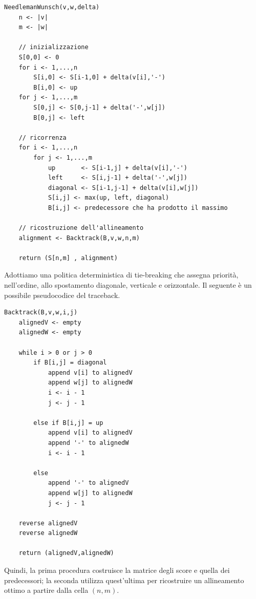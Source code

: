 \begin{codeblock}
\begin{lstlisting}[style=pseudo,caption={Global Alignment}]
NeedlemanWunsch(v,w,delta)
    n <- |v| 
    m <- |w|

    // inizializzazione
    S[0,0] <- 0
    for i <- 1,...,n
        S[i,0] <- S[i-1,0] + delta(v[i],'-')
        B[i,0] <- up
    for j <- 1,...,m
        S[0,j] <- S[0,j-1] + delta('-',w[j])
        B[0,j] <- left

    // ricorrenza
    for i <- 1,...,n
        for j <- 1,...,m
            up       <- S[i-1,j] + delta(v[i],'-')
            left     <- S[i,j-1] + delta('-',w[j])
            diagonal <- S[i-1,j-1] + delta(v[i],w[j])
            S[i,j] <- max(up, left, diagonal)
            B[i,j] <- predecessore che ha prodotto il massimo

    // ricostruzione dell'allineamento
    alignment <- Backtrack(B,v,w,n,m)

    return (S[n,m] , alignment)
\end{lstlisting}
\end{codeblock}

Adottiamo una politica deterministica di tie-breaking che assegna priorità, nell'ordine, allo spostamento diagonale, verticale e orizzontale.
Il seguente è un possibile pseudocodice del traceback.

\begin{codeblock}
\begin{lstlisting}[style=pseudo,caption={Ricostruzione dell'allineamento tramite traceback}]
Backtrack(B,v,w,i,j)
    alignedV <- empty
    alignedW <- empty

    while i > 0 or j > 0
        if B[i,j] = diagonal
            append v[i] to alignedV
            append w[j] to alignedW
            i <- i - 1
            j <- j - 1

        else if B[i,j] = up
            append v[i] to alignedV
            append '-' to alignedW
            i <- i - 1

        else
            append '-' to alignedV
            append w[j] to alignedW
            j <- j - 1

    reverse alignedV
    reverse alignedW

    return (alignedV,alignedW)
\end{lstlisting}
\end{codeblock}

Quindi, la prima procedura costruisce la matrice degli score e quella dei predecessori; la seconda utilizza quest'ultima per ricostruire
un allineamento ottimo a partire dalla cella $(n,m)$.

